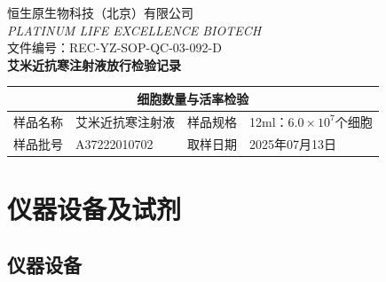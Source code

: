 \documentclass[UTF8,10pt,a4paper,fontset=fandol]{ctexart}
\newcommand{\fieldvalue}[1]{#1}
\newcommand{\handwritten}[1]{#1}
\begin{document}
\newpage

\begin{center}
恒生原生物科技（北京）有限公司\\
\textit{PLATINUM LIFE EXCELLENCE BIOTECH}\\[2mm]
文件编号：REC-YZ-SOP-QC-03-092-D\\
\textbf{艾米近抗寒注射液放行检验记录}
\end{center}

\begin{tabularx}{\textwidth}{|l|X|l|X|}
\hline
\multicolumn{4}{|c|}{细胞数量与活率检验}\\
\hline
样品名称 &
\fieldvalue{艾米近抗寒注射液} &
样品规格 &
\fieldvalue{12ml：$6.0\times 10^{7}$个细胞}\\
\hline
样品批号 &
\fieldvalue{\handwritten{A37222010702}} &
取样日期 &
\fieldvalue{\handwritten{2025年07月13日}}\\
\hline
\end{tabularx}

\section{仪器设备及试剂}

\subsection{仪器设备}
\end{document}
